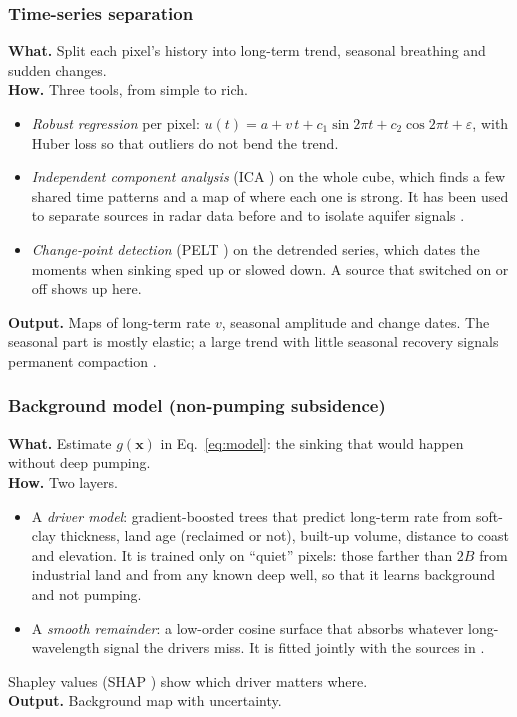 \subsubsection{ Time-series separation}
\textbf{What.} Split each pixel's history into long-term trend, seasonal breathing and sudden changes.\\
\textbf{How.} Three tools, from simple to rich.
\begin{itemize}
\item \emph{Robust regression} per pixel:
$u(t) = a + v\,t + c_1\sin 2\pi t + c_2\cos 2\pi t + \varepsilon$, with Huber loss so that outliers
do not bend the trend.
\item \emph{Independent component analysis} (ICA \cite{hyvarinen2000}) on the whole cube, which finds
a few shared time patterns and a map of where each one is strong. It has been used to separate
sources in radar data before \cite{ebmeier2016} and to isolate aquifer signals \cite{chaussard2014}.
\item \emph{Change-point detection} (PELT \cite{killick2012}) on the detrended series, which dates
the moments when sinking sped up or slowed down. A source that switched on or off shows up here.
\end{itemize}
\textbf{Output.} Maps of long-term rate $v$, seasonal amplitude and change dates. The seasonal part
is mostly elastic; a large trend with little seasonal recovery signals permanent compaction
\cite{hoffmann2001,smith2017}.

\subsubsection{ Background model (non-pumping subsidence)}
\textbf{What.} Estimate $g(\mathbf{x})$ in Eq.~\eqref{eq:model}: the sinking that would happen without
deep pumping.\\
\textbf{How.} Two layers.
\begin{itemize}
\item A \emph{driver model}: gradient-boosted trees \cite{chen2016} that predict long-term rate from
soft-clay thickness, land age (reclaimed or not), built-up volume, distance to coast and elevation.
It is trained only on ``quiet'' pixels: those farther than $2B$ from industrial land and from any
known deep well, so that it learns background and not pumping.
\item A \emph{smooth remainder}: a low-order cosine surface that absorbs whatever long-wavelength
signal the drivers miss. It is fitted jointly with the sources in .
\end{itemize}
Shapley values (SHAP \cite{lundberg2017}) show which driver matters where.\\
\textbf{Output.} Background map with uncertainty.

